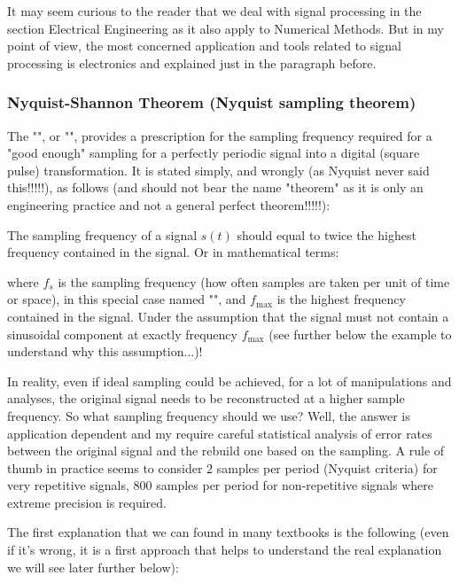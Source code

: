 	It may seem curious to the reader that we deal with signal processing in the section Electrical Engineering as it also apply to Numerical Methods. But in my point of view, the most concerned application and tools related to signal processing is electronics and explained just in the paragraph before.
	
	\subsubsection{Nyquist-Shannon Theorem (Nyquist sampling theorem)}
	The "", or "", provides a prescription for the sampling frequency required for a "good enough" sampling for a perfectly periodic signal into a digital (square pulse) transformation. It is stated simply, and wrongly (as Nyquist never said this!!!!!), as follows (and should not bear the name "theorem" as it is only an engineering practice and not a general perfect theorem!!!!!):
	\begin{theorem}
	The sampling frequency of a signal $s(t)$ should equal to twice the highest frequency contained in the signal. Or in mathematical terms:
	
	where $f_s$ is the sampling frequency (how often samples are taken per unit of time or space), in this special case named "", and $f_\mathrm{max}$ is the highest frequency contained in the signal. Under the assumption that the signal must not contain a sinusoidal component at exactly frequency $f_\mathrm{max}$ (see further below the example to understand why this assumption...)!
	\end{theorem}
	\begin{tcolorbox}[title=Remark,colframe=black,arc=10pt]
	In reality, even if ideal sampling could be achieved, for a lot of manipulations and analyses, the original signal needs to be reconstructed at a higher sample frequency. So what sampling frequency should we use? Well, the answer is application dependent and my require careful statistical analysis of error rates between the original signal and the rebuild one based on the sampling. A rule of thumb in practice seems to consider $2$ samples per period (Nyquist criteria) for very repetitive signals, $800$ samples per period for non-repetitive signals where extreme precision is required.
	\end{tcolorbox}
	The first explanation that we can found in many textbooks is the following (even if it's wrong, it is a first approach that helps to understand the real explanation we will see later further below):
	
